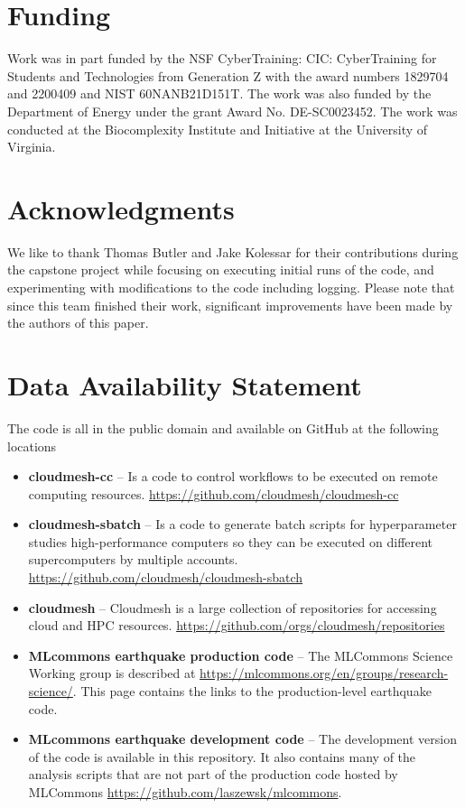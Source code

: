 \documentclass[utf8]{FrontiersinVancouver} %
\begin{document}
\section*{Funding}

Work was in part funded by the NSF CyberTraining: CIC: CyberTraining
for Students and Technologies from Generation Z with the award numbers
1829704 and 2200409 and NIST 60NANB21D151T.  The work was also funded
by the Department of Energy under the grant Award
No. DE-SC0023452. The work was conducted at the Biocomplexity
Institute and Initiative at the University of Virginia.

\section*{Acknowledgments}

We like to thank Thomas Butler and Jake Kolessar for their
contributions during the capstone project while focusing on executing
initial runs of the code, and experimenting with modifications to the
code including logging. Please note that since this team finished
their work, significant improvements have been made by the authors of
this paper.



\section*{Data Availability Statement}

The code is all in the public domain and available on GitHub at the following locations

\begin{itemize}

\item {\bf cloudmesh-cc} -- Is a code to control workflows to be executed on
  remote computing
  resources. \url{https://github.com/cloudmesh/cloudmesh-cc}

\item {\bf cloudmesh-sbatch} -- Is a code to generate batch scripts for
  hyperparameter studies high-performance computers so they can be
  executed on different supercomputers by multiple
  accounts. \url{https://github.com/cloudmesh/cloudmesh-sbatch}

\item {\bf cloudmesh} -- Cloudmesh is a large collection of repositories for
  accessing cloud and HPC
  resources. \url{https://github.com/orgs/cloudmesh/repositories}

\item {\bf MLcommons earthquake production code} -- The MLCommons Science
  Working group is described at
  \url{https://mlcommons.org/en/groups/research-science/}. This page
  contains the links to the production-level earthquake code.

\item {\bf MLcommons earthquake development code} -- The development version of
  the code is available in this repository. It also contains many of
  the analysis scripts that are not part of the production code
  hosted by MLCommons \url{https://github.com/laszewsk/mlcommons}.

\end{itemize}
\end{document}
